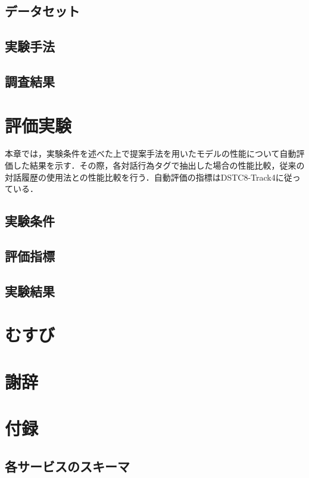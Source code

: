 \documentclass[12pt,frame,epsbox]{other/jmyreport}
\begin{document}
\section{データセット}

\section{実験手法}

\section{調査結果}

\chapter{評価実験}
本章では，実験条件を述べた上で提案手法を用いたモデルの性能について自動評価した結果を示す．その際，各対話行為タグで抽出した場合の性能比較，従来の対話履歴の使用法との性能比較を行う．自動評価の指標はDSTC8-Track4に従っている．
\section{実験条件}

\section{評価指標}

\section{実験結果}


\chapter{むすび}                          %



\chapter*{謝辞}                           %



\newpage






\chapter*{付録}
\def\thechapter{A}
\section{各サービスのスキーマ}

\end{document}
